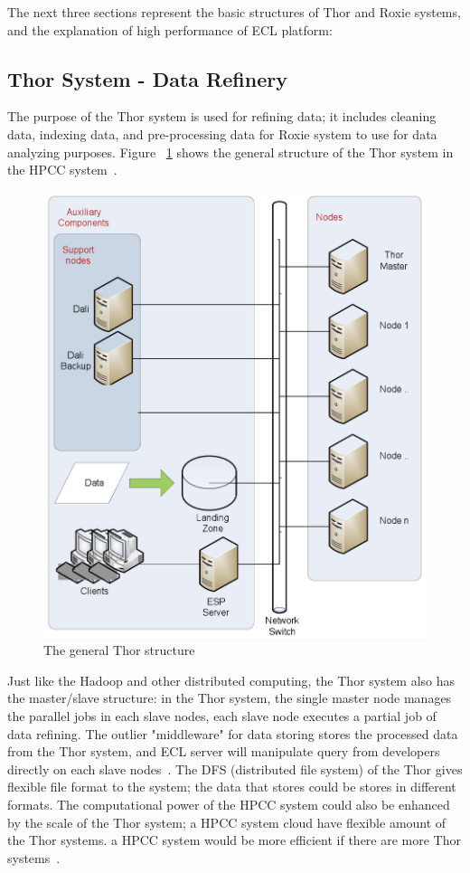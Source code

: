 The next three sections represent the basic structures of Thor and Roxie systems, and the explanation of high performance of ECL platform:

\subsection{Thor System - Data Refinery}

The purpose of the Thor system is used for refining data; it includes cleaning data, indexing data, and pre-processing data for Roxie system to use for data analyzing purposes. Figure ~\ref{f:thor} shows the general structure of the Thor system in the HPCC system~\cite{Intro4}.

\begin{figure}[!ht]
\centering\includegraphics[width=\columnwidth]{images/thor.png}
\caption{The general Thor structure}\label{f:thor}
\end{figure}

Just like the Hadoop and other distributed computing, the Thor system also has the master/slave structure: in the Thor system, the single master node manages the parallel jobs in each slave nodes, each slave node executes a partial job of data refining. The outlier "middleware" for data storing stores the processed data from the Thor system, and ECL server will manipulate query from developers directly on each slave nodes~\cite{Intro4}. The DFS (distributed file system) of the Thor gives flexible file format to the system; the data that stores could be stores in different formats. The computational power of the HPCC system could also be enhanced by the scale of the Thor system; a HPCC system cloud have flexible amount of the Thor systems. a HPCC system would be more efficient if there are more Thor systems~\cite{Intro4}.

